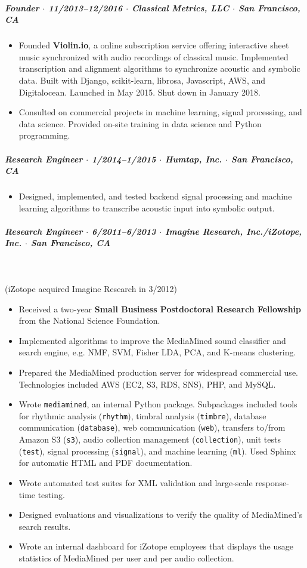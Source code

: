 \documentclass[10pt,letterpaper]{article}
\begin{document}
\subparagraph{Founder  $\cdot$ \textnormal{11/2013--12/2016} $\cdot$ Classical Metrics, LLC  $\cdot$ \textnormal{San Francisco, CA}}
\begin{itemize}
    \item Founded \textbf{Violin.io}, a online subscription service offering interactive sheet music synchronized with audio recordings of classical music. Implemented transcription and alignment algorithms to synchronize acoustic and symbolic data. Built with Django, scikit-learn, librosa, Javascript, AWS, and Digitalocean. Launched in May 2015. Shut down in January 2018.
    \item Consulted on commercial projects in machine learning, signal processing, and data science. Provided on-site training in data science and Python programming.
\end{itemize}


\subparagraph{Research Engineer  $\cdot$ \textnormal{1/2014--1/2015} $\cdot$ Humtap, Inc.  $\cdot$ \textnormal{San Francisco, CA}}
\begin{itemize}
    \item Designed, implemented, and tested backend signal processing and machine learning algorithms to transcribe acoustic input into symbolic output.
\end{itemize}


\subparagraph{Research Engineer  $\cdot$ \textnormal{6/2011--6/2013} $\cdot$ Imagine Research, Inc./iZotope, Inc.  $\cdot$ \textnormal{San Francisco, CA}} \ 

(iZotope acquired Imagine Research in 3/2012)
\begin{itemize}
    \item Received a two-year \textbf{Small Business Postdoctoral Research Fellowship} from the National Science Foundation.
    \item Implemented algorithms to improve the MediaMined sound classifier and search engine, e.g. NMF, SVM, Fisher LDA, PCA, and K-means clustering.
    \item Prepared the MediaMined production server for widespread commercial use. Technologies included AWS (EC2, S3, RDS, SNS), PHP, and MySQL.
    \item Wrote \texttt{mediamined}, an internal Python package. Subpackages included tools for rhythmic analysis (\texttt{rhythm}), timbral analysis (\texttt{timbre}), database communication (\texttt{database}), web communication (\texttt{web}), transfers to/from Amazon S3 (\texttt{s3}), audio collection management (\texttt{collection}), unit tests (\texttt{test}), signal processing (\texttt{signal}), and machine learning (\texttt{ml}). Used Sphinx for automatic HTML and PDF documentation.
    \item Wrote automated test suites for XML validation and large-scale response-time testing.
    \item Designed evaluations and visualizations to verify the quality of MediaMined's search results.
    \item Wrote an internal dashboard for iZotope employees that displays the usage statistics of MediaMined per user and per audio collection.
\end{itemize}
\end{document}
